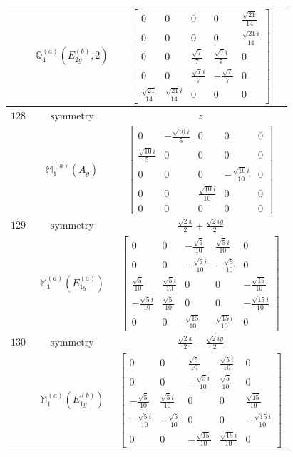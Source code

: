 \documentclass[fleqn,8pt,landscape]{jsarticle}
\begin{document}
\begin{longtable}{ccc}
$  $ & $ \mathbb{Q}_{4}^{(a)}(E_{2g}^{(b)},2) $ & $ \begin{bmatrix} 0 & 0 & 0 & 0 & \frac{\sqrt{21}}{14} \\ 0 & 0 & 0 & 0 & \frac{\sqrt{21} i}{14} \\ 0 & 0 & \frac{\sqrt{7}}{7} & \frac{\sqrt{7} i}{7} & 0 \\ 0 & 0 & \frac{\sqrt{7} i}{7} & - \frac{\sqrt{7}}{7} & 0 \\ \frac{\sqrt{21}}{14} & \frac{\sqrt{21} i}{14} & 0 & 0 & 0 \end{bmatrix} $ \\ \hline
$ 128 $ & $ \text{symmetry} $ & $ z $ \\
$  $ & $ \mathbb{M}_{1}^{(a)}(A_{g}) $ & $ \begin{bmatrix} 0 & - \frac{\sqrt{10} i}{5} & 0 & 0 & 0 \\ \frac{\sqrt{10} i}{5} & 0 & 0 & 0 & 0 \\ 0 & 0 & 0 & - \frac{\sqrt{10} i}{10} & 0 \\ 0 & 0 & \frac{\sqrt{10} i}{10} & 0 & 0 \\ 0 & 0 & 0 & 0 & 0 \end{bmatrix} $ \\ \hline
$ 129 $ & $ \text{symmetry} $ & $ \frac{\sqrt{2} x}{2} + \frac{\sqrt{2} i y}{2} $ \\
$  $ & $ \mathbb{M}_{1}^{(a)}(E_{1g}^{(a)}) $ & $ \begin{bmatrix} 0 & 0 & - \frac{\sqrt{5}}{10} & \frac{\sqrt{5} i}{10} & 0 \\ 0 & 0 & - \frac{\sqrt{5} i}{10} & - \frac{\sqrt{5}}{10} & 0 \\ \frac{\sqrt{5}}{10} & \frac{\sqrt{5} i}{10} & 0 & 0 & - \frac{\sqrt{15}}{10} \\ - \frac{\sqrt{5} i}{10} & \frac{\sqrt{5}}{10} & 0 & 0 & - \frac{\sqrt{15} i}{10} \\ 0 & 0 & \frac{\sqrt{15}}{10} & \frac{\sqrt{15} i}{10} & 0 \end{bmatrix} $ \\ \hline
$ 130 $ & $ \text{symmetry} $ & $ \frac{\sqrt{2} x}{2} - \frac{\sqrt{2} i y}{2} $ \\
$  $ & $ \mathbb{M}_{1}^{(a)}(E_{1g}^{(b)}) $ & $ \begin{bmatrix} 0 & 0 & \frac{\sqrt{5}}{10} & \frac{\sqrt{5} i}{10} & 0 \\ 0 & 0 & - \frac{\sqrt{5} i}{10} & \frac{\sqrt{5}}{10} & 0 \\ - \frac{\sqrt{5}}{10} & \frac{\sqrt{5} i}{10} & 0 & 0 & \frac{\sqrt{15}}{10} \\ - \frac{\sqrt{5} i}{10} & - \frac{\sqrt{5}}{10} & 0 & 0 & - \frac{\sqrt{15} i}{10} \\ 0 & 0 & - \frac{\sqrt{15}}{10} & \frac{\sqrt{15} i}{10} & 0 \end{bmatrix} $ \\ \hline

\end{longtable}
\end{document}
